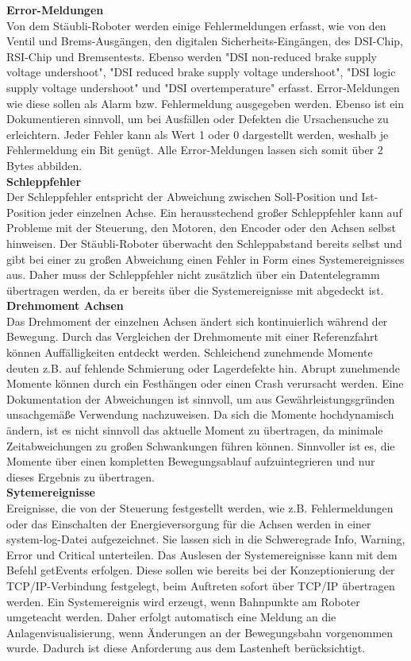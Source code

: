 \documentclass[ a4paper,
                oneside,
                toc=bibliography,
                toc=listof
                ]{scrbook}
\begin{document}
 	\textbf{Error-Meldungen}\\
 	Von dem Stäubli-Roboter werden einige Fehlermeldungen erfasst, wie von den Ventil und Brems-Ausgängen, den digitalen Sicherheits-Eingängen, des DSI-Chip, RSI-Chip und Bremsentests. Ebenso werden "DSI non-reduced brake supply voltage undershoot",  "DSI reduced brake supply voltage undershoot", "DSI logic supply voltage undershoot" und "DSI overtemperature" erfasst. Error-Meldungen wie diese sollen als Alarm bzw. Fehlermeldung ausgegeben werden. Ebenso ist ein Dokumentieren sinnvoll, um bei Ausfällen oder Defekten die Ursachensuche zu erleichtern. Jeder Fehler kann als Wert 1 oder 0 dargestellt werden, weshalb je Fehlermeldung ein Bit genügt. Alle Error-Meldungen lassen sich somit über 2 Bytes abbilden.\\
 	\textbf{Schleppfehler}\\
 	Der Schleppfehler entspricht der Abweichung zwischen Soll-Position und Ist-Position jeder einzelnen Achse. Ein herausstechend großer Schleppfehler kann auf Probleme mit der Steuerung, den Motoren, den Encoder oder den Achsen selbst hinweisen. Der Stäubli-Roboter überwacht den Schleppabstand bereits selbst und gibt bei einer zu großen Abweichung einen Fehler in Form eines Systemereignisses aus. Daher muss der Schleppfehler nicht zusätzlich über ein Datentelegramm übertragen werden, da er bereits über die Systemereignisse mit abgedeckt ist.\\
 	\textbf{Drehmoment Achsen}\\
 	Das Drehmoment der einzelnen Achsen ändert sich kontinuierlich während der Bewegung. Durch das Vergleichen der Drehmomente mit einer Referenzfahrt können  Auffälligkeiten entdeckt werden. Schleichend zunehmende Momente deuten z.B. auf fehlende Schmierung oder Lagerdefekte hin. Abrupt zunehmende Momente können durch ein Festhängen oder einen Crash verursacht werden. Eine Dokumentation der Abweichungen ist sinnvoll, um aus Gewährleistungsgründen unsachgemäße Verwendung nachzuweisen. Da sich die Momente hochdynamisch ändern, ist es nicht sinnvoll das aktuelle Moment zu übertragen, da minimale Zeitabweichungen zu großen Schwankungen führen können. Sinnvoller ist es, die Momente über einen kompletten Bewegungsablauf aufzuintegrieren und nur dieses Ergebnis zu übertragen.\\
	\textbf{Sytemereignisse}\\
	Ereignisse, die von der Steuerung festgestellt werden, wie z.B. Fehlermeldungen oder das Einschalten der Energieversorgung für die Achsen werden in einer system-log-Datei aufgezeichnet. Sie lassen sich in die Schweregrade \glqq Info\grqq{}, \glqq Warning\grqq{}, \glqq Error\grqq{} und \glqq Critical\grqq{} unterteilen. Das Auslesen der Systemereignisse kann mit dem Befehl \glqq getEvents\grqq{} erfolgen. Diese sollen wie bereits bei der Konzeptionierung der TCP/IP-Verbindung festgelegt, beim Auftreten sofort über TCP/IP übertragen werden. Ein Systemereignis wird erzeugt, wenn Bahnpunkte am Roboter umgeteacht werden. Daher erfolgt automatisch eine Meldung an die Anlagenvisualisierung, wenn Änderungen an der Bewegungsbahn vorgenommen wurde. Dadurch ist diese Anforderung aus dem Lastenheft berücksichtigt. \\
\end{document}
